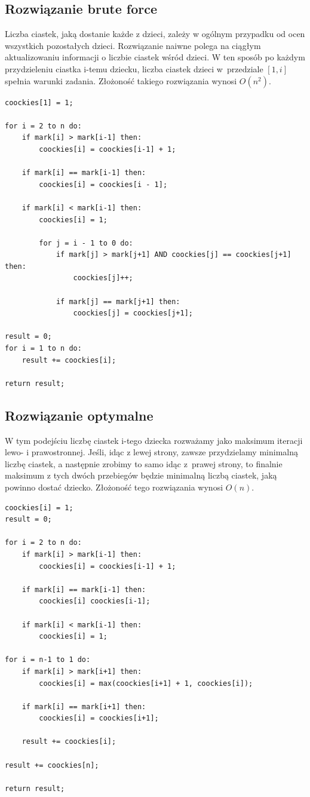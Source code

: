 \documentclass{article}
\begin{document}
	\subsection{Rozwiązanie brute force}
		Liczba ciastek, jaką dostanie każde z dzieci, zależy w ogólnym przypadku od ocen wszystkich pozostałych dzieci. Rozwiązanie naiwne polega na ciągłym aktualizowaniu informacji o liczbie ciastek wśród dzieci. W ten sposób po każdym przydzieleniu ciastka i-temu dziecku, liczba ciastek dzieci w~przedziale $[1, i]$ spełnia warunki zadania. Złożoność takiego rozwiązania wynosi $O(n^2)$.
		\begin{lstlisting}[tabsize=2,frame=single]
coockies[1] = 1;

for i = 2 to n do:
	if mark[i] > mark[i-1] then:
	 	coockies[i] = coockies[i-1] + 1;

	if mark[i] == mark[i-1] then:
		coockies[i] = coockies[i - 1];

	if mark[i] < mark[i-1] then:
		coockies[i] = 1;

		for j = i - 1 to 0 do:
			if mark[j] > mark[j+1] AND coockies[j] == coockies[j+1] then:
				coockies[j]++;

			if mark[j] == mark[j+1] then:
				coockies[j] = coockies[j+1];

result = 0;
for i = 1 to n do:
	result += coockies[i];

return result;
		\end{lstlisting}
	\newpage
	\subsection{Rozwiązanie optymalne}
		W tym podejściu liczbę ciastek i-tego dziecka rozważamy jako maksimum iteracji lewo- i prawostronnej. Jeśli, idąc z lewej strony, zawsze przydzielamy minimalną liczbę ciastek, a następnie zrobimy to samo idąc z~prawej strony, to finalnie maksimum z tych dwóch przebiegów będzie minimalną liczbą ciastek, jaką powinno dostać dziecko. Złożoność tego rozwiązania wynosi $O(n)$.
		\begin{lstlisting}[tabsize=2, frame=single]
coockies[i] = 1;
result = 0;

for i = 2 to n do:
	if mark[i] > mark[i-1] then:
		coockies[i] = coockies[i-1] + 1;

	if mark[i] == mark[i-1] then:
		coockies[i] coockies[i-1];

	if mark[i] < mark[i-1] then:
		coockies[i] = 1;

for i = n-1 to 1 do:
	if mark[i] > mark[i+1] then:
		coockies[i] = max(coockies[i+1] + 1, coockies[i]);

	if mark[i] == mark[i+1] then:
		coockies[i] = coockies[i+1];

	result += coockies[i];

result += coockies[n];

return result;

		\end{lstlisting}
\end{document}
